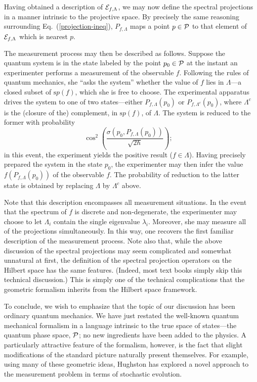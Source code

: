 \documentclass[12pt,aps,eqsecnum,tighten,nofootinbib]{revtex4-2}
\def\P{{\cal P}}
\newcommand{\eqn}[1]{Eq.~(\ref{#1})}
\def\Bbb{}
\begin{document}
Having obtained a description of ${\cal E}_{f, \Lambda}$, we may now
define the spectral projections in a manner intrinsic to the
projective space.  By precisely the same reasoning surrounding
\eqn{projection-ineq}, ${\Bbb P}_{f, \Lambda}$ maps a point $p\in\P$
to that element of ${\cal E}_{f, \Lambda}$ which is nearest $p$.

The measurement process may then be described as follows.  Suppose the
quantum system is in the state labeled by the point $p_0\in\P$ at the
instant an experimenter performs a measurement of the observable $f$.
Following the rules of quantum mechanics, she ``asks the system''
whether the value of $f$ lies in $\Lambda$---a closed subset of
${\mathrm sp}(f)$, which she is free to choose.  The experimental
apparatus drives the system to one of two states---either ${\Bbb
P}_{f, \Lambda}(p_0)$ or ${\Bbb P}_{f, \Lambda^c}(p_0)$, where
$\Lambda^c$ is the (closure of the) complement, in ${\mathrm sp}(f)$,
of $\Lambda$.  The system is reduced to the former with probability
%
\[
 \cos^2 \left(
 \frac{\sigma ( p_0, {\Bbb P}_{f, \Lambda}(p_0))}{\sqrt{2\hbar}}
 \right);
\]
%
in this event, the experiment yields the positive result
($f\in\Lambda$).  Having precisely prepared the system in the state
$p_0$, the experimenter may then infer the value $f({\Bbb P}_{f,
\Lambda}(p_0))$ of the observable $f$.  The probability of reduction
to the latter state is obtained by replacing $\Lambda$ by $\Lambda^c$
above.

Note that this description encompasses all measurement situations.  In
the event that the spectrum of $f$ is discrete and non-degenerate, the
experimenter may choose to let $\Lambda_i$ contain the single
eigenvalue $\lambda_i$.  Moreover, she may measure all of the
projections simultaneously.  In this way, one recovers the first
familiar description of the measurement process.  Note also that,
while the above discussion of the spectral projections may seem
complicated and somewhat unnatural at first, the definition of the
spectral projection operators on the Hilbert space has the same
features. (Indeed, most text books simply skip this technical
discussion.) This is simply one of the technical complications that
the geometric formalism inherits from the Hilbert space framework.

To conclude, we wish to emphasize that the topic of our discussion has
been ordinary quantum mechanics.  We have just restated the well-known
quantum mechanical formalism in a language intrinsic to the true space
of states---the quantum phase space, $\P$; no new ingredients have
been added to the physics.  A particularly attractive feature of the
formalism, however, is the fact that slight modifications of the
standard picture naturally present themselves.  For example, using
many of these geometric ideas, Hughston\cite{hughston2} has explored a
novel approach to the measurement problem in terms of stochastic
evolution.
\end{document}
